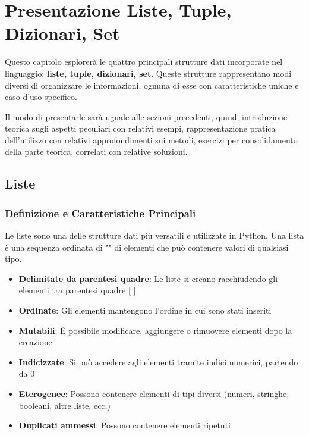 \clearpage

\section{Presentazione Liste, Tuple, Dizionari, Set}

Questo capitolo esplorerà le quattro principali strutture dati incorporate nel linguaggio: \textbf{liste, tuple, dizionari, set}. Queste strutture rappresentano modi diversi di organizzare le informazioni, ognuna di esse con caratteristiche uniche e caso d'uso specifico.



Il modo di presentarle sarà uguale alle sezioni precedenti, quindi introduzione teorica sugli aspetti peculiari con relativi esempi, rappresentazione pratica dell'utilizzo con relativi approfondimenti sui metodi, esercizi per consolidamento della parte teorica, correlati con relative soluzioni.





\subsection{Liste}\label{ListeCap1}
\subsubsection{Definizione e Caratteristiche Principali}

Le liste sono una delle strutture dati più versatili e utilizzate in Python. Una lista è una sequenza ordinata di "\textbf{}" di elementi che può contenere valori di qualsiasi tipo.

\begin{tcolorbox}[colback=blue!5!white,colframe=blue!75!black,title=Caratteristiche principali delle liste]
\begin{itemize}
    \item \textbf{Delimitate da parentesi quadre}: Le liste si creano racchiudendo gli elementi tra parentesi quadre [ ]
    \item \textbf{Ordinate}: Gli elementi mantengono l'ordine in cui sono stati inseriti
    \item \textbf{Mutabili}: È possibile modificare, aggiungere o rimuovere elementi dopo la creazione
    \item \textbf{Indicizzate}: Si può accedere agli elementi tramite indici numerici, partendo da 0
    \item \textbf{Eterogenee}: Possono contenere elementi di tipi diversi (numeri, stringhe, booleani, altre liste, ecc.)
    \item \textbf{Duplicati ammessi}: Possono contenere elementi ripetuti
\end{itemize}
\end{tcolorbox}

